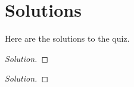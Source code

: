 \section*{Solutions}
Here are the solutions to the quiz.
\begin{proof}[Solution]
\end{proof}
\begin{proof}[Solution]
\end{proof}

